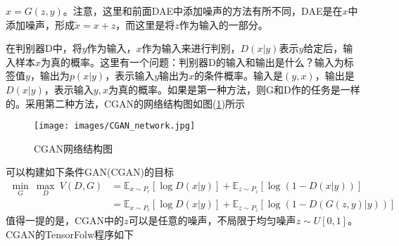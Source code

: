         $x = G(z,y)$。注意，这里和前面DAE中添加噪声的方法有所不同，DAE是在$x$中添加噪声，形成$\tilde{x} = x+z$，而这里是将$z$作为输入的一部分。
        \par
        在判别器D中，将$y$作为输入，$x$作为输入来进行判别，$D(x|y)$表示$y$给定后，输入样本$x$为真的概率。这里有一个问题：判别器D的输入和输出是什么？输入为标签值$y$，输出为$p(x|y)$，表示输入$y$输出为$x$的条件概率。输入是$(y,x)$，输出是$D(x|y)$，表示输入$y,x$为真的概率。如果是第一种方法，则G和D作的任务是一样的。采用第二种方法，CGAN的网络结构图如图(\ref{fig:CGAN网络结构图})所示
                \begin{figure}[H]
                \centering
                \texttt{[image: images/CGAN\_network.jpg]}
                \caption{CGAN网络结构图}
                \label{fig:CGAN网络结构图}
                \end{figure}
        可以构建如下条件GAN(CGAN)的目标
        \begin{align*}
        \min_G\ \max_D\ V(D,G) & = \mathbb{E}_{x\sim P_r}[\log D(x|y)] + \mathbb{E}_{z\sim P_z}[\log (1-D(x|y))]\\
        & = \mathbb{E}_{x\sim P_r}[\log D(x|y)] + \mathbb{E}_{z\sim P_z}[\log (1-D(G(z,y)|y))]
        \end{align*}
        值得一提的是，CGAN中的$z$可以是任意的噪声，不局限于均匀噪声$z\sim U[0,1]$。CGAN的TensorFolw程序如下
